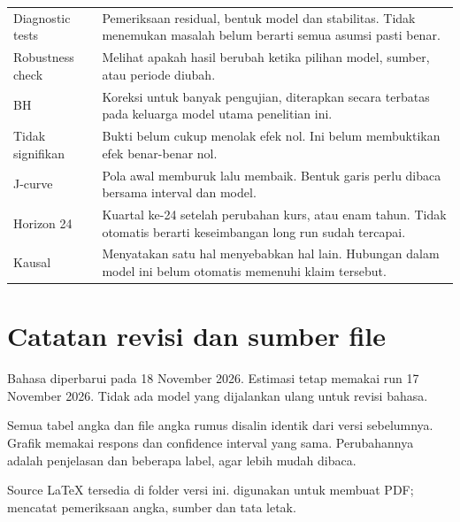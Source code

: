 \begin{longtable}{p{.26\linewidth}p{.63\linewidth}}
Diagnostic tests & Pemeriksaan residual, bentuk model dan stabilitas. Tidak menemukan masalah belum berarti semua asumsi pasti benar.\\
Robustness check & Melihat apakah hasil berubah ketika pilihan model, sumber, atau periode diubah.\\
BH & Koreksi untuk banyak pengujian, diterapkan secara terbatas pada keluarga model utama penelitian ini.\\
Tidak signifikan & Bukti belum cukup menolak efek nol. Ini belum membuktikan efek benar-benar nol.\\
J-curve & Pola awal memburuk lalu membaik. Bentuk garis perlu dibaca bersama interval dan model.\\
Horizon 24 & Kuartal ke-24 setelah perubahan kurs, atau enam tahun. Tidak otomatis berarti keseimbangan long run sudah tercapai.\\
Kausal & Menyatakan satu hal menyebabkan hal lain. Hubungan dalam model ini belum otomatis memenuhi klaim tersebut.\\
\bottomrule\end{longtable}

\section{Catatan revisi dan sumber file}
Bahasa diperbarui pada 18 November 2026. Estimasi tetap memakai run 17 November 2026. Tidak ada model yang dijalankan ulang untuk revisi bahasa.

Semua tabel angka dan file angka rumus disalin identik dari versi sebelumnya. Grafik memakai respons dan confidence interval yang sama. Perubahannya adalah penjelasan dan beberapa label, agar lebih mudah dibaca.

Source LaTeX tersedia di folder versi ini.  digunakan untuk membuat PDF;  mencatat pemeriksaan angka, sumber dan tata letak.

